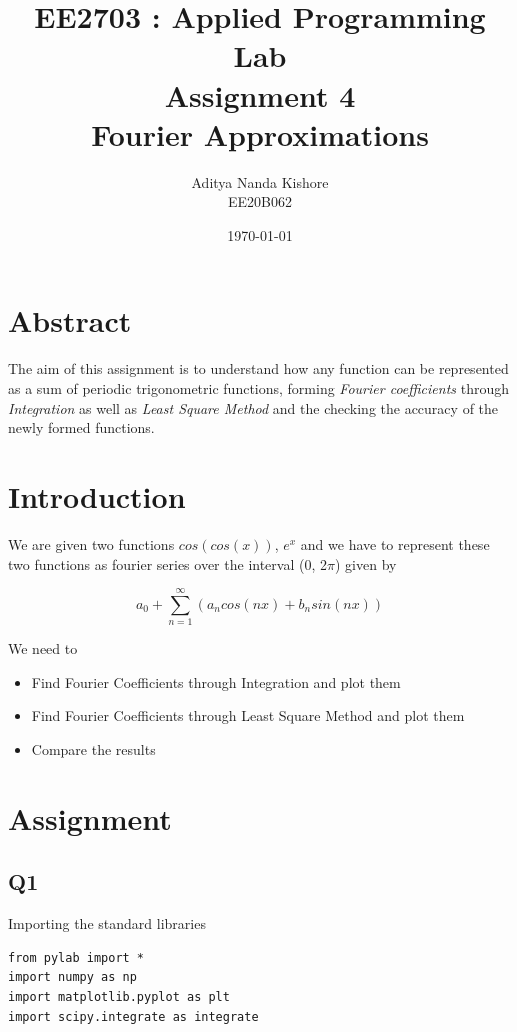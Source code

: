 \documentclass[12pt, a4paper]{report}
\title{\textbf{EE2703 : Applied Programming Lab \\ Assignment 4 \\ Fourier Approximations}}
\author{Aditya Nanda Kishore\\ EE20B062}
\date{\today} %
\begin{document}
		
\maketitle
\section{Abstract}
The aim of this assignment is to understand how any function can be represented as a sum of periodic trigonometric functions, forming \textit{Fourier coefficients} through \textit{Integration} as well as \textit{Least Square Method} and the checking the accuracy of the newly formed functions.



\section{Introduction}
We are given two functions $cos(cos(x))$, $e^x$  and we have to represent these two functions as fourier series over the interval (0, 2$\pi$) 
given by \newline

\large

\begin{equation}
a_0 + \sum_{n=1}^{\infty} (a_n cos(nx) + b_n sin(nx))
\end{equation}

\normalsize
We need to
\begin{itemize}
	\item Find Fourier Coefficients through Integration and plot them
	\item Find Fourier Coefficients through Least Square Method and plot them
	\item Compare the results
\end{itemize}
\section{Assignment}
\subsection{Q1}
Importing the standard libraries
\begin{Verbatim}
from pylab import *
import numpy as np
import matplotlib.pyplot as plt
import scipy.integrate as integrate
\end{Verbatim}
\end{document}
